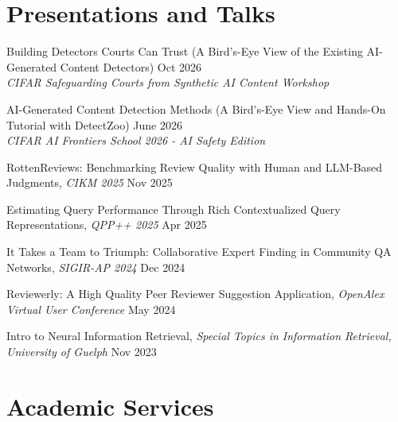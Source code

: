 \documentclass[]{resume-openfont}
\begin{document}
\section{Presentations and Talks}
\vspace{-5pt}
\begin{bullets}[leftmargin=*]
    \item Building Detectors Courts Can Trust (A Bird’s-Eye View of the Existing AI-Generated Content Detectors)
 \hfill Oct 2026 \\ \textit{CIFAR Safeguarding Courts from Synthetic AI Content Workshop}
    \item AI-Generated Content Detection Methods (A Bird's-Eye View and Hands-On Tutorial with DetectZoo) \hfill June 2026 \\ \textit{CIFAR AI Frontiers School 2026 - AI Safety Edition}
    \item RottenReviews: Benchmarking Review Quality with Human and LLM-Based Judgments, \textit{CIKM 2025} \hfill Nov 2025
    \item Estimating Query Performance Through Rich Contextualized Query Representations, \textit{QPP++ 2025} \hfill Apr 2025
    \item It Takes a Team to Triumph: Collaborative Expert Finding in Community QA Networks, \textit{SIGIR-AP 2024} \hfill Dec 2024
    \item Reviewerly: A High Quality Peer Reviewer Suggestion Application, \textit{OpenAlex Virtual User Conference} \hfill May 2024
    \item Intro to Neural Information Retrieval, \textit{Special Topics in Information Retrieval, University of Guelph} \hfill Nov 2023
\end{bullets}
\vspace{3pt}


\section{Academic Services}
\vspace{-7pt}

\end{document}
